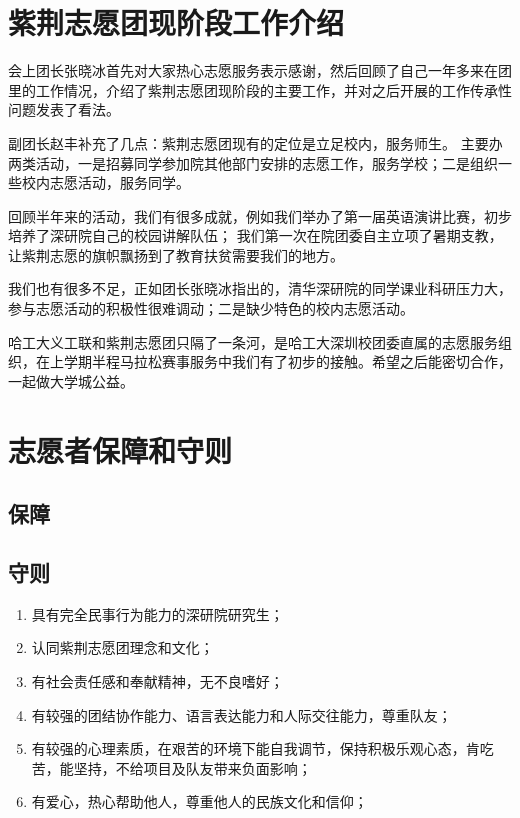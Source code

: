 \documentclass[12pt]{ctexart}
\begin{document}
\begin{appendix}
\section{紫荆志愿团现阶段工作介绍}
会上团长张晓冰首先对大家热心志愿服务表示感谢，然后回顾了自己一年多来在团里的工作情况，介绍了紫荆志愿团现阶段的主要工作，并对之后开展的工作传承性问题发表了看法。

副团长赵丰补充了几点：紫荆志愿团现有的定位是立足校内，服务师生。
主要办两类活动，一是招募同学参加院其他部门安排的志愿工作，服务学校；二是组织一些校内志愿活动，服务同学。

回顾半年来的活动，我们有很多成就，例如我们举办了第一届英语演讲比赛，初步培养了深研院自己的校园讲解队伍；
我们第一次在院团委自主立项了暑期支教，让紫荆志愿的旗帜飘扬到了教育扶贫需要我们的地方。

我们也有很多不足，正如团长张晓冰指出的，清华深研院的同学课业科研压力大，参与志愿活动的积极性很难调动；二是缺少特色的校内志愿活动。

哈工大义工联和紫荆志愿团只隔了一条河，是哈工大深圳校团委直属的志愿服务组织，在上学期半程马拉松赛事服务中我们有了初步的接触。希望之后能密切合作，一起做大学城公益。
\section{志愿者保障和守则}
\subsection{保障}
\subsection{守则}
\begin{enumerate}[label = {(\chinese*)}]
\item 具有完全民事行为能力的深研院研究生；
\item 认同紫荆志愿团理念和文化；
\item 有社会责任感和奉献精神，无不良嗜好；
\item 有较强的团结协作能力、语言表达能力和人际交往能力，尊重队友；
\item 有较强的心理素质，在艰苦的环境下能自我调节，保持积极乐观心态，肯吃苦，能坚持，不给项目及队友带来负面影响； 
\item 有爱心，热心帮助他人，尊重他人的民族文化和信仰；
\end{enumerate}
\end{appendix}
\end{document}
